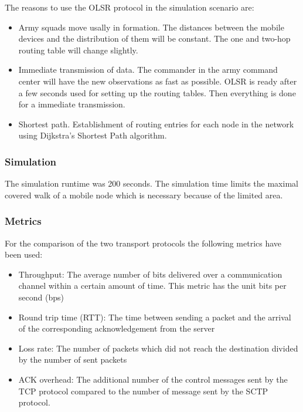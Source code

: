 \documentclass[a4paper]{article}
\begin{document}
The reasons to use the OLSR protocol in the simulation scenario are:
\begin{itemize}
	\item Army squads move usally in formation. The distances between the mobile devices and the distribution of them will be constant. The one and two-hop routing table will change slightly.
	\item Immediate transmission of data. The commander in the army command center will have the new observations as fast as possible. OLSR is ready after a few seconds used for setting up the routing tables. Then everything is done for a immediate transmission.
	\item Shortest path. Establishment of routing entries for each node in the network using Dijkstra's Shortest Path algorithm.
\end{itemize}


\subsubsection{Simulation}
The simulation runtime was 200 seconds. The simulation time limits the maximal covered walk of a mobile node which is necessary because of the limited area.
\subsubsection{Metrics}
For the comparison of the two transport protocols the following metrics have been used:
\begin{itemize}
	\item Throughput: The average number of bits delivered over a communication channel within a certain amount of time. This metric has the unit bits per second (bps)
	\item Round trip time (RTT): The time between sending a packet and the arrival of the corresponding acknowledgement from the server
	\item Loss rate: The number of packets which did not reach the destination divided by the number of sent packets
	\item ACK overhead: The additional number of the control messages sent by the TCP protocol compared to the number of message sent by the SCTP protocol.
\end{itemize}			
\end{document}
